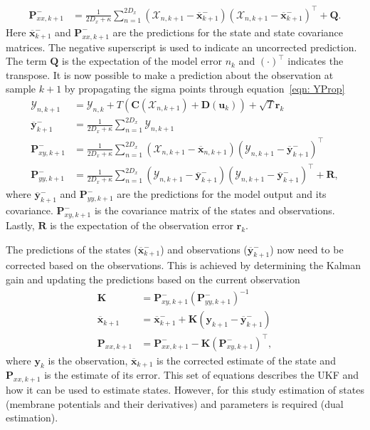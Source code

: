 \begin{align}
\mathbf{P}_{xx,k+1}^{-} &= \frac{1}{2D_{x}+\kappa}\sum_{n=1}^{2D_{x}} (\mathbf{\mathcal{X}}_{n,k+1} -\mathbf{\overline{x}}_{k+1}^{-})(\mathbf{\mathcal{X}}_{n,k+1}-\mathbf{\overline{x}}_{k+1}^{-})^{\top} + \mathbf{Q}.%
\end{align} Here $\overline{\mathbf{x}}_{k+1}^{-}$ and $\mathbf{P}_{xx,k+1}^{-}$ are the predictions for the state and state covariance matrices. The negative superscript is used to indicate an uncorrected prediction. The term $\mathbf{Q}$ is the expectation of the model error $n_{k}$ and $(\cdot)^{\top}$ indicates the transpose. It is now possible to make a prediction about the observation at sample $k+1$ by propagating the sigma points through equation~\ref{eqn: YProp} \begin{align} %
\mathbf{\mathcal{Y}}_{n,k+1} &= \mathbf{\mathcal{Y}}_{n,k} + T(\mathbf{C}(\mathbf{\mathcal{X}}_{n,k+1})+ \mathbf{D}(\mathbf{u}_{k}))+ \sqrt{T}\mathbf{r}_{k}\\
\overline{\mathbf{y}}_{k+1}^{-} &= \frac{1}{2D_{x}+\kappa}\sum_{n=1}^{2D_{x}} \mathbf{\mathcal{Y}}_{n,k+1}\\
\label{eqn: statecovg}
\mathbf{P}_{xy,k+1}^{-} &= \frac{1}{2D_{x}+\kappa}\sum_{n=1}^{2D_{x}} (\mathbf{\mathcal{X}}_{n,k+1}-\overline{\mathbf{x}}_{n,k+1}) (\mathbf{\mathcal{Y}}_{n,k+1}-\overline{\mathbf{y}}_{k+1}^{-})^{\top}\\
\mathbf{P}_{yy,k+1}^{-} &= \frac{1}{2D_{x}+\kappa}\sum_{n=1}^{2D_{x}} (\mathbf{\mathcal{Y}}_{n,k+1}-\overline{\mathbf{y}}_{k+1}^{-}) (\mathbf{\mathcal{Y}}_{n,k+1}-\overline{\mathbf{y}}_{k+1}^{-})^{\top} +\mathbf{R},%
\end{align} where $\overline{\mathbf{y}}_{k+1}^{-}$ and $\mathbf{P}_{yy,k+1}^{-}$ are the predictions for the model output and its covariance. $\mathbf{P}_{xy,k+1}^{-}$ is the covariance matrix of the states and observations. Lastly, $\mathbf{R}$ is the expectation of the observation error $\mathbf{r}_{k}$.

The predictions of the states ($\overline{\mathbf{x}}_{k+1}^{-}$) and observations ($\overline{\mathbf{y}}_{k+1}^{-}$) now need to be corrected based on the observations. This is achieved by determining the Kalman gain and updating the predictions based on the current observation \begin{align}
\mathbf{K} &= \mathbf{P}_{xy,k+1}^{-}(\mathbf{P}_{yy,k+1}^{-})^{-1}\\
\overline{\mathbf{x}}_{k+1} &= \overline{\mathbf{x}}_{k+1}^{-} + \mathbf{K}(\mathbf{y}_{k+1}-\overline{\mathbf{y}}_{k+1}^{-})\\
\mathbf{P}_{xx,k+1} &= \mathbf{P}_{xx,k+1}^{-} - \mathbf{K}(\mathbf{P}_{xy,k+1}^{-})^{\top},
\end{align} where $\mathbf{y}_{k}$ is the observation, $\overline{\mathbf{x}}_{k+1}$ is the corrected estimate of the state and $\mathbf{P}_{xx,k+1}$ is the estimate of its error. This set of equations describes the UKF and how it can be used to estimate states. However, for this study estimation of states (membrane potentials and their derivatives) and parameters is required (dual estimation).

